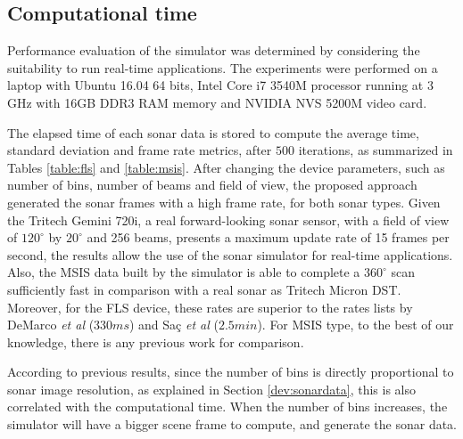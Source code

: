\documentclass[final,5p,times]{elsarticle}
\begin{document}
\subsection{Computational time}

Performance evaluation of the simulator was determined by considering the suitability to run real-time applications. The experiments were performed on a laptop with Ubuntu 16.04 64 bits, Intel Core i7 3540M processor running at 3 GHz with 16GB DDR3 RAM memory and NVIDIA NVS 5200M video card.

The elapsed time of each sonar data is stored to compute the average time, standard deviation and frame rate metrics, after $500$ iterations, as summarized in Tables \ref{table:fls} and \ref{table:msis}. After changing the device parameters, such as number of bins, number of beams and field of view, the proposed approach generated the sonar frames with a high frame rate, for both sonar types. Given the Tritech Gemini 720i, a real forward-looking sonar sensor, with a field of view of $120^{\circ}$ by $20^{\circ}$ and 256 beams, presents a maximum update rate of 15 frames per second, the results allow the use of the sonar simulator for real-time applications. Also, the MSIS data built by the simulator is able to complete a $360^{\circ}$ scan sufficiently fast in comparison with a real sonar as Tritech Micron DST. Moreover, for the FLS device, these rates are superior to the rates lists by DeMarco \textit{et al} \cite{demarco2015} ($330 ms$) and Saç \textit{et al} \cite{sac2015} ($2.5 min$). For MSIS type, to the best of our knowledge, there is any previous work for comparison.

According to previous results, since the number of bins is directly proportional to sonar image resolution, as explained in Section \ref{dev:sonardata}, this is also correlated with the computational time. When the number of bins increases, the simulator will have a bigger scene frame to compute, and generate the sonar data.
\end{document}
